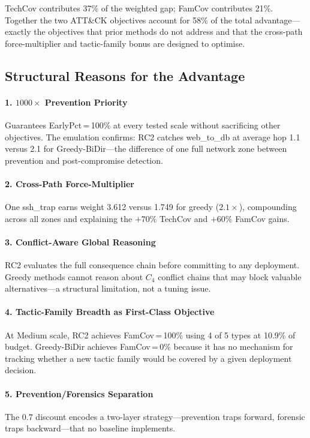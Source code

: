 \documentclass[journal]{IEEEtran}
\begin{document}
TechCov contributes 37\% of the weighted gap; FamCov contributes
21\%. Together the two ATT\&CK objectives account for 58\% of the
total advantage---exactly the objectives that prior methods do not
address and that the cross-path force-multiplier and tactic-family
bonus are designed to optimise.

\subsection{Structural Reasons for the Advantage}

\paragraph{1. $1000\times$ Prevention Priority}
Guarantees EarlyPct\,=\,100\% at every tested scale without
sacrificing other objectives. The emulation confirms: RC2 catches
web\_to\_db at average hop 1.1 versus 2.1 for Greedy-BiDir---the
difference of one full network zone between prevention and
post-compromise detection.

\paragraph{2. Cross-Path Force-Multiplier}
One ssh\_trap earns weight 3.612 versus 1.749 for greedy
($2.1\times$), compounding across all zones and explaining the
$+70\%$ TechCov and $+60\%$ FamCov gains.

\paragraph{3. Conflict-Aware Global Reasoning}
RC2 evaluates the full consequence chain before committing to
any deployment. Greedy methods cannot reason about $C_4$ conflict
chains that may block valuable alternatives---a structural
limitation, not a tuning issue.

\paragraph{4. Tactic-Family Breadth as First-Class Objective}
At Medium scale, RC2 achieves FamCov\,=\,100\% using 4 of 5 types
at 10.9\% of budget. Greedy-BiDir achieves FamCov\,=\,0\% because
it has no mechanism for tracking whether a new tactic family would
be covered by a given deployment decision.

\paragraph{5. Prevention/Forensics Separation}
The $0.7$ discount encodes a two-layer strategy---prevention traps
forward, forensic traps backward---that no baseline implements.
\end{document}

